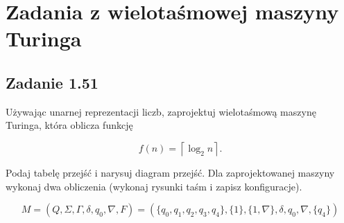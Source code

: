 \documentclass[leqno]{article}
\newcommand{\ceil}[1]{\left\lceil #1 \right\rceil}
\begin{document}
    \section{Zadania z wielotaśmowej maszyny Turinga}
        \subsection{Zadanie 1.51}
        
            Używając unarnej reprezentacji liczb, zaprojektuj wielotaśmową
            maszynę Turinga, która oblicza funkcję

            \begin{equation}
                f(n) = \ceil{\log_2 n}.
            \end{equation}

            Podaj tabelę przejść i narysuj diagram przejść. Dla zaprojektowanej maszyny
            wykonaj dwa obliczenia (wykonaj rysunki taśm i zapisz konfiguracje).

            \begin{equation}
                    M = (Q, \Sigma, \Gamma, \delta, q_0, \nabla, F) = (
                        \{q_0, q_1, q_2, q_3, q_4\}, 
                        \{1\}, 
                        \{1, \nabla\}, 
                        \delta, 
                        q_0, 
                        \nabla, 
                        \{q_4\}
                    )
            \end{equation}

            \begin{center}
            \end{center}
\end{document}
